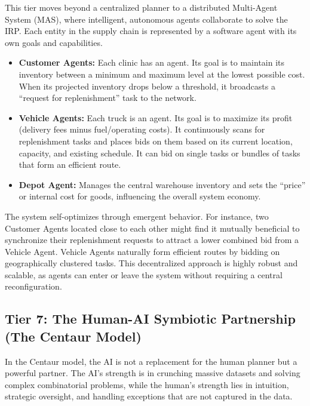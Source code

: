 \documentclass{article}
\begin{document}
This tier moves beyond a centralized planner to a distributed Multi-Agent System (MAS), where intelligent, autonomous agents collaborate to solve the IRP. Each entity in the supply chain is represented by a software agent with its own goals and capabilities.

\begin{itemize}
    \item \textbf{Customer Agents:} Each clinic has an agent. Its goal is to maintain its inventory between a minimum and maximum level at the lowest possible cost. When its projected inventory drops below a threshold, it broadcasts a ``request for replenishment'' task to the network.
    \item \textbf{Vehicle Agents:} Each truck is an agent. Its goal is to maximize its profit (delivery fees minus fuel/operating costs). It continuously scans for replenishment tasks and places bids on them based on its current location, capacity, and existing schedule. It can bid on single tasks or bundles of tasks that form an efficient route.
    \item \textbf{Depot Agent:} Manages the central warehouse inventory and sets the ``price'' or internal cost for goods, influencing the overall system economy.
\end{itemize}

The system self-optimizes through emergent behavior. For instance, two Customer Agents located close to each other might find it mutually beneficial to synchronize their replenishment requests to attract a lower combined bid from a Vehicle Agent. Vehicle Agents naturally form efficient routes by bidding on geographically clustered tasks. This decentralized approach is highly robust and scalable, as agents can enter or leave the system without requiring a central reconfiguration.

\subsection{Tier 7: The Human-AI Symbiotic Partnership (The Centaur Model)}

In the Centaur model, the AI is not a replacement for the human planner but a powerful partner. The AI's strength is in crunching massive datasets and solving complex combinatorial problems, while the human's strength lies in intuition, strategic oversight, and handling exceptions that are not captured in the data.
\end{document}
